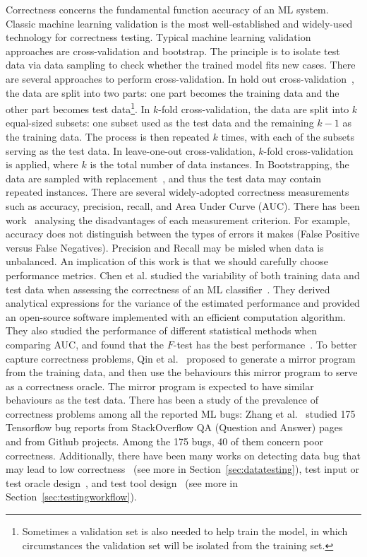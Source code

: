 \label{sec:effectiveness} 
Correctness concerns the fundamental function accuracy of an ML system.
Classic machine learning validation is the most well-established and widely-used technology for correctness testing.
Typical machine learning validation approaches are cross-validation and bootstrap. The principle is to isolate test data via data sampling to check whether the trained model fits new cases.
There are several approaches to perform cross-validation.
In hold out cross-validation~, the data are split into two parts: one part becomes the training data and the other part becomes test data\footnote{Sometimes a validation set is also needed to help train the model, in which circumstances the validation set will be isolated from the training set.}.
In $k$-fold cross-validation, the data are split into $k$ equal-sized subsets: one subset used as the test data and the remaining $k-1$ as the training data. 
The process is then repeated $k$ times, with each of the subsets serving as the test data.
In leave-one-out cross-validation, $k$-fold cross-validation is applied, where $k$ is the total number of data instances.
In Bootstrapping, the data are sampled with replacement~, and thus the test data may contain repeated instances.
There are several widely-adopted correctness measurements such as accuracy, precision, recall, and Area Under Curve (AUC).
There has been work~ analysing the disadvantages of each measurement criterion. 
For example, accuracy does not distinguish between the types of errors it makes (False Positive versus False Negatives). 
Precision and Recall may be misled when data is unbalanced. 
An implication of this work is that we should carefully choose performance metrics.
Chen et al. studied the variability of both training data and test data when assessing the correctness of an ML classifier~.
They derived analytical expressions for the variance of the estimated performance and provided an open-source software implemented with an efficient computation algorithm.
They also studied the performance of different statistical methods when comparing AUC, and found that the $F$-test has the best performance~. 
To better capture correctness problems, Qin et al.~ proposed to generate a mirror program from the training data, and then use the behaviours this mirror program to serve as a correctness oracle.
The mirror program is expected to have similar behaviours as the test data.
There has been a study of the prevalence of correctness problems among all the reported ML bugs: 
Zhang et al.~ studied 175 Tensorflow bug reports from StackOverflow QA (Question and Answer) pages and from Github projects.
Among the 175 bugs, 40 of them concern poor correctness.
Additionally, there have been many works on 
detecting data bug that may lead to low correctness~ (see more in Section~\ref{sec:datatesting}),
test input or test oracle design~,
and test tool design~ (see more in Section~\ref{sec:testingworkflow}).

